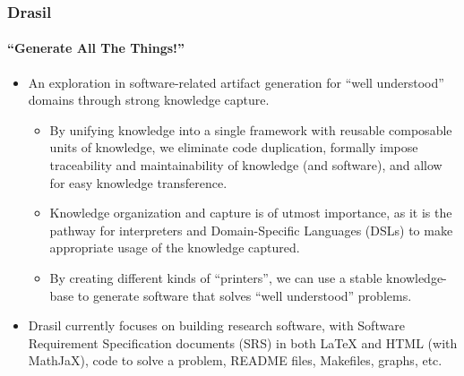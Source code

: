 \documentclass{beamer}
\begin{document}
\begin{frame}
\end{frame}

\begin{frame}
    \frametitle{Drasil}
    \framesubtitle{``Generate All The Things!''}
    
    \begin{itemize}
        \item<2-> An exploration in software-related artifact generation for ``well understood''\cite{KnowledgeCapture2021} domains through strong knowledge capture.
            \begin{itemize}
                \item<3-> By unifying knowledge into a single framework with reusable composable units of knowledge, we eliminate code duplication, formally impose traceability and maintainability of knowledge (and software), and allow for easy knowledge transference.
                \item<4-> Knowledge organization and capture is of utmost importance, as it is the pathway for interpreters and Domain-Specific Languages (DSLs) to make appropriate usage of the knowledge captured.
                \item<5-> By creating different kinds of ``printers'', we can use a stable knowledge-base to generate software that solves ``well understood'' problems.
            \end{itemize}
        \item<6-> Drasil currently focuses on building research software, with Software Requirement Specification documents (SRS) in both LaTeX and HTML (with MathJaX), code to solve a problem, README files, Makefiles, graphs, etc.
    \end{itemize}
\end{frame}
\end{document}

